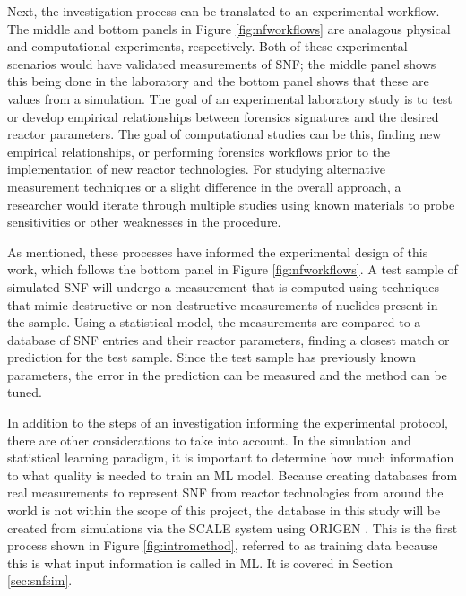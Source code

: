 Next, the investigation process can be translated to an experimental workflow.
The middle and bottom panels in Figure \ref{fig:nfworkflows} are analagous
physical and computational experiments, respectively.  Both of these
experimental scenarios would have validated measurements of \gls{SNF}; the
middle panel shows this being done in the laboratory and the bottom panel shows
that these are values from a simulation. The goal of an experimental laboratory
study is to test or develop empirical relationships between forensics
signatures and the desired reactor parameters. The goal of computational
studies can be this, finding new empirical relationships, or performing
forensics workflows prior to the implementation of new reactor technologies.
For studying alternative measurement techniques or a slight difference in the
overall approach, a researcher would iterate through multiple studies using
known materials to probe sensitivities or other weaknesses in the procedure.

As mentioned, these processes have informed the experimental design of this
work, which follows the bottom panel in Figure \ref{fig:nfworkflows}. A test
sample of simulated \gls{SNF} will undergo a measurement that is computed using
techniques that mimic destructive or non-destructive measurements of nuclides
present in the sample.  Using a statistical model, the measurements are
compared to a database of \gls{SNF} entries and their reactor parameters,
finding a closest match or prediction for the test sample. Since the test
sample has previously known parameters, the error in the prediction can be
measured and the method can be tuned. 

In addition to the steps of an investigation informing the experimental
protocol, there are other considerations to take into account. In the
simulation and statistical learning paradigm, it is important to determine how
much information to what quality is needed to train an \gls{ML} model. Because
creating databases from real measurements to represent \gls{SNF} from reactor
technologies from around the world is not within the scope of this project, the
database in this study will be created from simulations via the \gls{SCALE}
\cite{scale} system using \gls{ORIGEN} \cite{origen, origenarp}. This is the
first process shown in Figure \ref{fig:intromethod}, referred to as training
data because this is what input information is called in \gls{ML}. It is
covered in Section \ref{sec:snfsim}.

